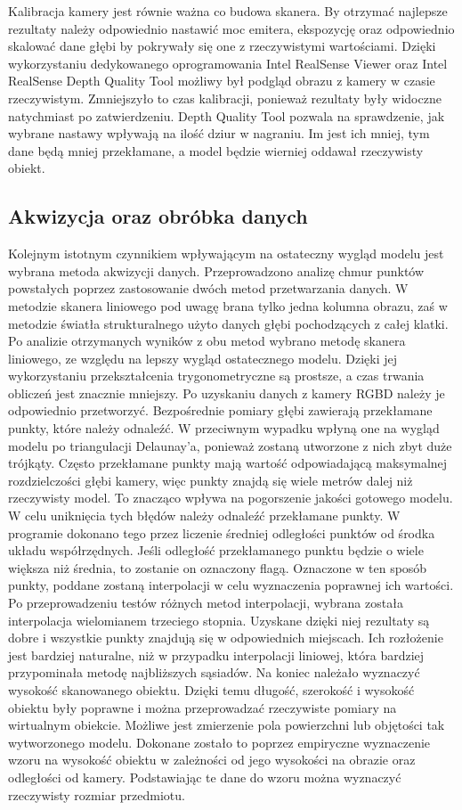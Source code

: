 Kalibracja kamery jest równie ważna co budowa skanera. By otrzymać najlepsze rezultaty należy odpowiednio nastawić moc emitera, ekspozycję oraz odpowiednio skalować dane głębi by pokrywały się one z rzeczywistymi wartościami. Dzięki wykorzystaniu dedykowanego oprogramowania Intel RealSense Viewer oraz Intel RealSense Depth Quality Tool możliwy był podgląd obrazu z kamery w czasie rzeczywistym. Zmniejszyło to czas kalibracji, ponieważ rezultaty były widoczne natychmiast po zatwierdzeniu. Depth Quality Tool pozwala na sprawdzenie, jak wybrane nastawy wpływają na ilość dziur w nagraniu. Im jest ich mniej, tym dane będą mniej przekłamane, a model będzie wierniej oddawał rzeczywisty obiekt.
\subsection{Akwizycja oraz obróbka danych}
Kolejnym istotnym czynnikiem wpływającym na ostateczny wygląd modelu jest wybrana metoda akwizycji danych. Przeprowadzono analizę chmur punktów powstałych poprzez zastosowanie dwóch metod przetwarzania danych. W metodzie skanera liniowego pod uwagę brana tylko jedna kolumna obrazu, zaś w metodzie światła strukturalnego użyto danych głębi pochodzących z całej klatki. Po analizie otrzymanych wyników z obu metod wybrano metodę skanera liniowego, ze względu na lepszy wygląd ostatecznego modelu. Dzięki jej wykorzystaniu przekształcenia trygonometryczne są prostsze, a czas trwania obliczeń jest znacznie mniejszy. Po uzyskaniu danych z kamery RGBD należy je odpowiednio przetworzyć. Bezpośrednie pomiary głębi zawierają przekłamane punkty, które należy odnaleźć. W przeciwnym wypadku wpłyną one na wygląd modelu po triangulacji Delaunay'a, ponieważ zostaną utworzone z nich zbyt duże trójkąty. Często przekłamane punkty mają wartość odpowiadającą maksymalnej rozdzielczości głębi kamery, więc punkty znajdą się wiele metrów dalej niż rzeczywisty model. To znacząco wpływa na pogorszenie jakości gotowego modelu. W celu uniknięcia tych błędów należy odnaleźć przekłamane punkty. W programie dokonano tego przez liczenie średniej odległości punktów od środka układu współrzędnych. Jeśli odległość przekłamanego punktu będzie o wiele większa niż średnia, to zostanie on oznaczony flagą. Oznaczone w ten sposób punkty, poddane zostaną interpolacji w celu wyznaczenia poprawnej ich wartości.
\newline \indent Po przeprowadzeniu testów różnych metod interpolacji, wybrana została interpolacja wielomianem trzeciego stopnia. Uzyskane dzięki niej rezultaty są dobre i wszystkie punkty znajdują się w odpowiednich miejscach. Ich rozłożenie jest bardziej naturalne, niż w przypadku interpolacji liniowej, która bardziej przypominała metodę najbliższych sąsiadów.
\newline \indent Na koniec należało wyznaczyć wysokość skanowanego obiektu. Dzięki temu długość, szerokość i wysokość obiektu były poprawne i można przeprowadzać rzeczywiste pomiary na wirtualnym obiekcie. Możliwe jest zmierzenie pola powierzchni lub objętości tak wytworzonego modelu. Dokonane zostało to poprzez empiryczne wyznaczenie wzoru na wysokość obiektu w zależności od jego wysokości na obrazie oraz odległości od kamery. Podstawiając te dane do wzoru można wyznaczyć rzeczywisty rozmiar przedmiotu.
